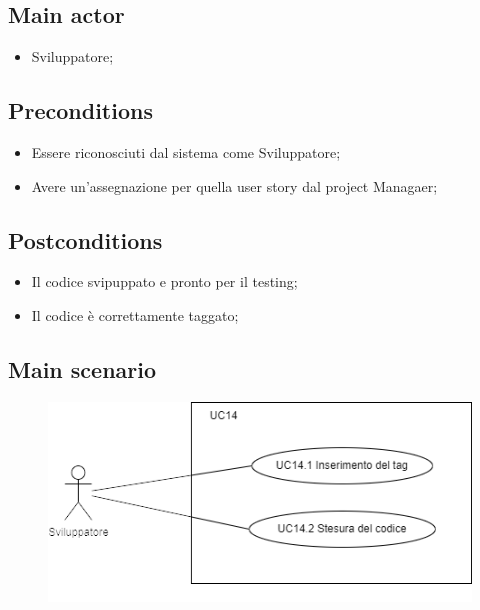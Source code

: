 \documentclass{article}
\begin{document}
    \subsection*{Main actor}
        \begin{itemize}
            \item Sviluppatore;
        \end{itemize}
    
    \subsection*{Preconditions}
        \begin{itemize}
            \item Essere riconosciuti dal sistema come Sviluppatore;
            \item Avere un'assegnazione per quella user story dal project Managaer;
        \end{itemize}
        
    \subsection*{Postconditions} 
        \begin{itemize}
            \item Il codice svipuppato e pronto per il testing;
            \item Il codice è correttamente taggato;  
        \end{itemize}
    
    \subsection*{Main scenario}
        \begin{figure}[h]
          \centering
          \includegraphics{documenti/imgUML/UC14-zoom.png}
          \label{fig:immagine}
        \end{figure}
        
\end{document}
